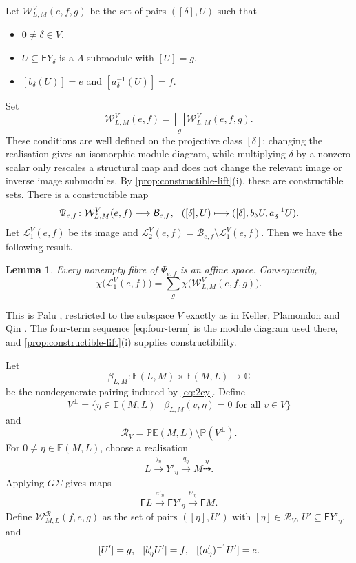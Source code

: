 \documentclass[11pt,reqno]{article}
\numberwithin{equation}{section}
\newtheorem{lemma}[lemma]{Lemma}
\theoremstyle{definition}
\newcommand{\E}{\mathbb E}
\newcommand{\F}{\mathsf F}
\newcommand{\kk}{\mathbb C}
\newcommand{\xto}[1]{\xrightarrow{#1}}
\newcommand{\etri}{\dashrightarrow}
\begin{document}
Let $\mathcal W^V_{L,M}(e,f,g)$ be the set of pairs $([\delta],U)$ such that
\begin{itemize}[leftmargin=2em]
\item $0\neq\delta\in V$.
\item $U\subseteq\F Y_\delta$ is a $\Lambda$-submodule with $[U]=g$.
\item $[b_\delta(U)]=e$ and $[a_\delta^{-1}(U)]=f$.
\end{itemize}
Set
\[
 \mathcal W^V_{L,M}(e,f)=\bigsqcup_g\mathcal W^V_{L,M}(e,f,g).
\]
These conditions are well defined on the projective class $[\delta]$: changing the realisation gives an isomorphic module diagram, while multiplying $\delta$ by a nonzero scalar only rescales a structural map and does not change the relevant image or inverse image submodules.  By \cref{prop:constructible-lift}(i), these are constructible sets.  There is a constructible map
\[
\Psi_{e,f}\colon\mathcal W^V_{L,M}(e,f)\longrightarrow\mathcal B_{e,f},
 \hspace{2.5mm}
 ([\delta],U)\longmapsto
 ([\delta],b_\delta U,a_\delta^{-1}U).
\]
Let $\mathcal L^V_1(e,f)$ be its image and $
 \mathcal L^V_2(e,f)=\mathcal B_{e,f}\setminus\mathcal L^V_1(e,f).
$ Then we have the following result.

\begin{lemma}\label{lem:forward-fibres}
Every nonempty fibre of $\Psi_{e,f}$ is an affine space.  Consequently,
\[
 \chi\bigl(\mathcal L^V_1(e,f)\bigr)
 =\sum_g\chi\bigl(\mathcal W^V_{L,M}(e,f,g)\bigr).
\]
\end{lemma}

This is Palu \cite[Lemma~3.2]{Palu2012}, restricted to the subspace $V$ exactly as in Keller, Plamondon and Qin \cite[Lemma~2.13]{KellerPlamondonQin}.  The four-term sequence \eqref{eq:four-term} is the module diagram used there, and \cref{prop:constructible-lift}(i) supplies constructibility.


Let
\[
 \beta_{L,M}\colon\E(L,M)\times\E(M,L)\longrightarrow\kk
\]
be the nondegenerate pairing induced by \eqref{eq:2cy}.  Define
\[
 V^\perp=\{\eta\in\E(M,L)\mid \beta_{L,M}(v,\eta)=0
 \text{ for all }v\in V\}
\]
and
\[
 \mathcal R_V=\mathbb P\E(M,L)\setminus\mathbb P(V^\perp).
\]
For $0\neq\eta\in\E(M,L)$, choose a realisation
\[
 L\xto{j_\eta}Y'_\eta\xto{q_\eta}M\overset{\eta}{\etri}.
\]
Applying $G\Sigma$ gives maps
\[
 \F L\xto{a'_\eta}\F Y'_\eta\xto{b'_\eta}\F M.
\]
Define $\mathcal W^{\mathcal R}_{M,L}(f,e,g)$ as the set of pairs $([\eta],U')$ with $[\eta]\in\mathcal R_V$, $U'\subseteq\F Y'_\eta$, and
\[
 [U']=g,
\hspace{2.5mm}
 [b'_\eta U']=f,
\hspace{2.5mm}
 [(a'_\eta)^{-1}U']=e.
\]
\end{document}
